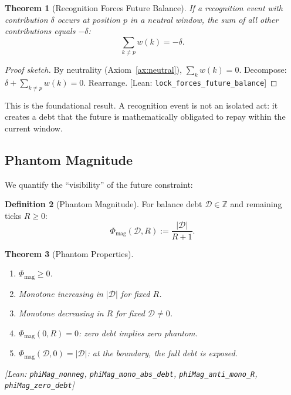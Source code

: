 \documentclass[11pt, a4paper]{article}
\newcommand{\leanref}[1]{\texttt{\small #1}}
\newtheorem{theorem}{Theorem}[section]
\theoremstyle{definition}
\newtheorem{definition}[theorem]{Definition}
\theoremstyle{remark}
\begin{document}
\begin{theorem}[Recognition Forces Future Balance]\label{thm:lock}
If a recognition event with contribution $\delta$ occurs at position
$p$ in a neutral window, the sum of all other contributions equals
$-\delta$:
\[
\sum_{k \neq p} w(k) = -\delta.
\]
\end{theorem}

\begin{proof}[Proof sketch]
By neutrality (Axiom~\ref{ax:neutral}), $\sum_{k} w(k) = 0$.
Decompose: $\delta + \sum_{k \neq p} w(k) = 0$. Rearrange.
\textup{[Lean: \leanref{lock\_forces\_future\_balance}]}
\end{proof}

This is the foundational result. A recognition event is not an
isolated act: it creates a debt that the future is mathematically
obligated to repay within the current window.

\subsection{Phantom Magnitude}

We quantify the ``visibility'' of the future constraint:

\begin{definition}[Phantom Magnitude]\label{def:phimag}
For balance debt $\mathcal{D} \in \mathbb{Z}$ and remaining ticks
$R \geq 0$:
\begin{equation}\label{eq:phimag}
    \Phi_{\mathrm{mag}}(\mathcal{D}, R)
    := \frac{|\mathcal{D}|}{R + 1}.
\end{equation}
\end{definition}

\begin{theorem}[Phantom Properties]\label{thm:phantom-props}
\begin{enumerate}
    \item[\textup{(a)}] $\Phi_{\mathrm{mag}} \geq 0$.
    \item[\textup{(b)}] Monotone increasing in
    $|\mathcal{D}|$ for fixed $R$.
    \item[\textup{(c)}] Monotone decreasing in $R$ for fixed
    $\mathcal{D} \neq 0$.
    \item[\textup{(d)}] $\Phi_{\mathrm{mag}}(0, R) = 0$: zero debt
    implies zero phantom.
    \item[\textup{(e)}] $\Phi_{\mathrm{mag}}(\mathcal{D}, 0) =
    |\mathcal{D}|$: at the boundary, the full debt is exposed.
\end{enumerate}
\textup{[Lean: \leanref{phiMag\_nonneg},
\leanref{phiMag\_mono\_abs\_debt},
\leanref{phiMag\_anti\_mono\_R},
\leanref{phiMag\_zero\_debt}]}
\end{theorem}
\end{document}
